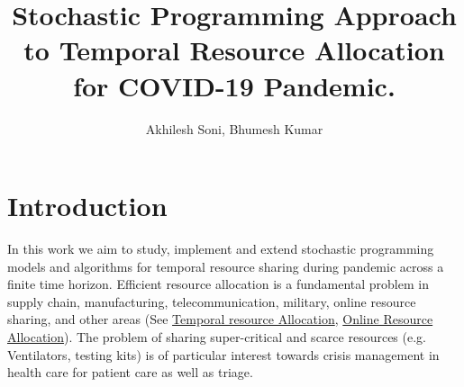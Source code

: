\documentclass[11pt,letterpaper]{article}
\begin{document}
\begin{comment}



\end{comment}

\title{Stochastic Programming Approach to Temporal Resource Allocation for COVID-19 Pandemic.}
\date{}
\author{Akhilesh Soni, Bhumesh Kumar}
\maketitle
\section{Introduction}
In this work we aim to study, implement and extend stochastic programming models and algorithms for temporal resource sharing during pandemic across a finite time horizon.  Efficient resource allocation is a fundamental problem in supply chain, manufacturing, telecommunication, military, online resource sharing, and other areas (See \href{https://apps.dtic.mil/dtic/tr/fulltext/u2/a423115.pdf}{Temporal resource Allocation}, \href{https://arxiv.org/pdf/1610.02143.pdf}{Online Resource Allocation}). The problem of sharing super-critical and scarce resources (e.g. Ventilators, testing kits) is of particular interest towards crisis management in health care for patient care as well as triage.   
\end{document}
